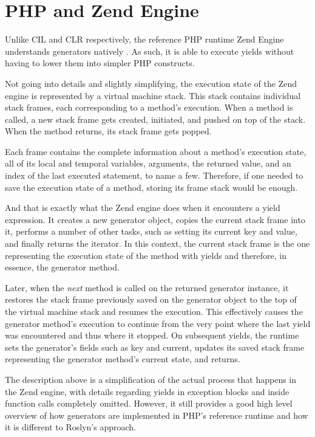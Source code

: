 \section{PHP and Zend Engine}

Unlike CIL and CLR respectively, the reference PHP runtime Zend Engine understands generators natively \citep{ZendGen}. As such, it is able to execute yields without having to lower them into simpler PHP constructs.

Not going into details and slightly simplifying, the execution state of the Zend engine is represented by a virtual machine stack. This stack contains individual stack frames, each corresponding to a method’s execution. When a method is called, a new stack frame gets created, initiated, and pushed on top of the stack. When the method returns, its stack frame gets popped.

Each frame contains the complete information about a method’s execution state, all of its local and temporal variables, arguments, the returned value, and an index of the last executed statement, to name a few. Therefore, if one needed to save the execution state of a method, storing its frame stack would be enough.

And that is exactly what the Zend engine does when it encounters a yield expression. It creates a new generator object, copies the current stack frame into it, performs a number of other tasks, such as setting its current key and value, and finally returns the iterator. In this context, the current stack frame is the one representing the execution state of the method with yields and therefore, in essence, the generator method.

Later, when the \emph{next} method is called on the returned generator instance, it restores the stack frame previously saved on the generator object to the top of the virtual machine stack and resumes the execution. This effectively causes the generator method’s execution to continue from the very point where the last yield was encountered and thus where it stopped. On subsequent yields, the runtime sets the generator’s fields such as key and current, updates its saved stack frame representing the generator method's current state, and returns.

The description above is a simplification of the actual process that happens in the Zend engine, with details regarding yields in exception blocks and inside function calls completely omitted. However, it still provides a good high level overview of how generators are implemented in PHP’s reference runtime and how it is different to Roslyn’s approach.  
